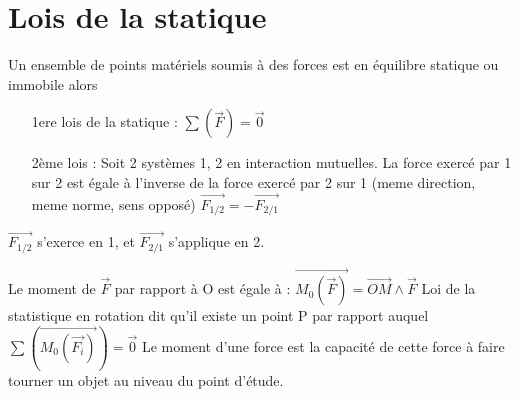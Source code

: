 \section{Lois de la statique}

\begin{wrapfigure}[5]{r}{0pt}
\end{wrapfigure}
Un ensemble de points matériels soumis à des forces est en équilibre statique ou immobile alors 
\begin{itemize}
	\item[1ere lois de la statique :] $\sum(\vec{F}) = \vec{0}$
	\item[2ème lois :] Soit 2 systèmes 1, 2 en interaction mutuelles. La force exercé par 1 sur 2 est égale à l'inverse de la force exercé par 2 sur 1 (meme direction, meme norme, sens opposé)
		$\overrightarrow{F_{1/2}} = - \overrightarrow{F_{2/1}}$
\end{itemize}

$\vec{F_{1/2}}$ s'exerce en 1, et $\vec{F_{2/1}}$ s'applique en 2.


		Le moment de $\vec{F}$ par rapport à O est égale à :
		$\overrightarrow{M_0(\vec{F})}  = \overrightarrow{OM} \wedge \vec{F}$
		Loi de la statistique en rotation dit qu'il existe un point P par rapport auquel $\sum(\overrightarrow{M_0(\vec{F_i})}) = \vec{0}$
		Le moment d'une force est la capacité de cette force à faire tourner un objet au niveau du point d'étude.

